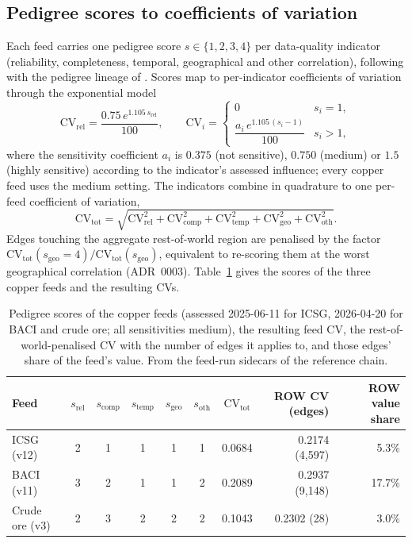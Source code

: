 \documentclass[11pt]{article}
\begin{document}
\subsection{Pedigree scores to coefficients of variation}
Each feed carries one pedigree score $s\in\{1,2,3,4\}$ per data-quality
indicator (reliability, completeness, temporal, geographical and other
correlation), following \citet{laner2016} with the pedigree lineage of
\citet{weidema1996pedigree}. Scores map to per-indicator coefficients of
variation through the exponential model
\begin{equation}
\mathrm{CV}_{\mathrm{rel}} = \frac{0.75\, e^{1.105\, s_{\mathrm{rel}}}}{100},
\qquad
\mathrm{CV}_{i} =
\begin{cases}
0 & s_i = 1,\\[2pt]
\dfrac{a_i\, e^{1.105\,(s_i-1)}}{100} & s_i > 1,
\end{cases}
\end{equation}
where the sensitivity coefficient $a_i$ is $0.375$ (not sensitive), $0.750$
(medium) or $1.5$ (highly sensitive) according to the indicator's assessed
influence; every copper feed uses the medium setting. The indicators combine
in quadrature to one per-feed coefficient of variation,
\begin{equation}
\mathrm{CV}_{\mathrm{tot}} = \sqrt{\mathrm{CV}_{\mathrm{rel}}^2 +
\mathrm{CV}_{\mathrm{comp}}^2 + \mathrm{CV}_{\mathrm{temp}}^2 +
\mathrm{CV}_{\mathrm{geo}}^2 + \mathrm{CV}_{\mathrm{oth}}^2}.
\end{equation}
Edges touching the aggregate rest-of-world region are penalised by the factor
$\mathrm{CV}_{\mathrm{tot}}(s_{\mathrm{geo}}{=}4)/\mathrm{CV}_{\mathrm{tot}}(s_{\mathrm{geo}})$,
equivalent to re-scoring them at the worst geographical correlation
(ADR~0003). Table~\ref{tab:si-pedigree} gives the scores of the three
copper feeds and the resulting CVs.

\begin{table}[h]
\centering\small
\begin{tabular}{@{}lccccccrr@{}}
\toprule
Feed & $s_{\mathrm{rel}}$ & $s_{\mathrm{comp}}$ & $s_{\mathrm{temp}}$ & $s_{\mathrm{geo}}$ & $s_{\mathrm{oth}}$ & $\mathrm{CV}_{\mathrm{tot}}$ & ROW CV (edges) & ROW value share \\
\midrule
ICSG (v12)      & 2 & 1 & 1 & 1 & 1 & 0.0684 & 0.2174 (4{,}597) & 5.3\% \\
BACI (v11)      & 3 & 2 & 1 & 1 & 2 & 0.2089 & 0.2937 (9{,}148) & 17.7\% \\
Crude ore (v3)  & 2 & 3 & 2 & 2 & 2 & 0.1043 & 0.2302 (28)      & 3.0\% \\
\bottomrule
\end{tabular}
\caption{Pedigree scores of the copper feeds (assessed 2025-06-11 for ICSG,
2026-04-20 for BACI and crude ore; all sensitivities medium), the resulting
feed CV, the rest-of-world-penalised CV with the number of edges it applies
to, and those edges' share of the feed's value. From the feed-run sidecars
of the reference chain.}
\label{tab:si-pedigree}
\end{table}
\end{document}
